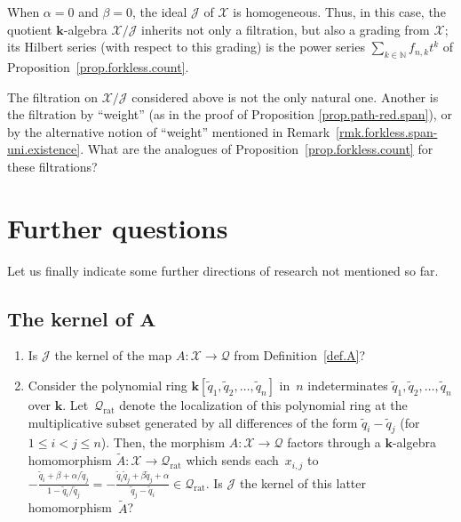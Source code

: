 \documentclass[pdftex]{sigma}
\numberwithin{equation}{section}
\let\sumnonlimits\sum
\renewcommand{\sum}{\sumnonlimits\limits}
\begin{document}
When $\alpha=0$ and $\beta=0$, the ideal $\mathcal{J}$ of $\mathcal{X}$ is homogeneous. Thus, in this case, the quotient $\mathbf{k}$-algebra $\mathcal{X}/\mathcal{J}$ inherits not only a filtration, but also a grading from $\mathcal{X}$; its Hilbert series (with respect to this grading) is the power series $\sum_{k\in\mathbb{N}}f_{n,k}t^{k}$ of Proposition~\ref{prop.forkless.count}.

\begin{question}The filtration on $\mathcal{X}/\mathcal{J}$ considered above is not the only natural one. Another is the filtration by ``weight'' (as in the proof of Proposition \ref{prop.path-red.span}), or by the alternative notion of ``weight'' mentioned in Remark~\ref{rmk.forkless.span-uni.existence}. What are the analogues of Proposition~\ref{prop.forkless.count} for these filtrations?
\end{question}

\section{Further questions}

Let us finally indicate some further directions of research not mentioned so far.

\subsection[The kernel of $A$]{The kernel of $\boldsymbol{A}$}\label{subsect.Qrat}
\begin{question}\label{quest.Ainj}\quad
\begin{enumerate}\itemsep=0pt
\item[(a)] Is $\mathcal{J}$ the kernel of the map $A\colon \mathcal{X}\rightarrow\mathcal{Q}$ from Definition~\ref{def.A}?

\item[(b)] Consider the polynomial ring $\mathbf{k}[ \widetilde{q}_{1},\widetilde{q}_{2},\ldots,\widetilde{q}_{n}] $ in~$n$ indeterminates $\widetilde{q}_{1},\widetilde{q}_{2},\ldots,\widetilde{q}_{n}$ over $\mathbf{k}$. Let~$\mathcal{Q}_{\operatorname*{rat}}$ denote the localization of this polynomial ring at the multiplicative subset gene\-ra\-ted by all differences of the form $\widetilde{q}_{i}-\widetilde{q}_{j}$ (for $1\leq i<j\leq n$). Then, the morphism $A\colon \mathcal{X}\rightarrow\mathcal{Q}$ factors through a $\mathbf{k}$-algebra homomorphism $\widetilde{A}\colon \mathcal{X} \rightarrow\mathcal{Q}_{\operatorname*{rat}}$ which sends each~$x_{i,j}$ to $-\frac{\widetilde{q}_{i}+\beta+\alpha/\widetilde{q}_{j}}{1-\widetilde{q} _{i}/\widetilde{q}_{j}}=-\frac{\widetilde{q}_{i}\widetilde{q}_{j}+\beta\widetilde{q}_{j}+\alpha}{\widetilde{q}_{j}-\widetilde{q}_{i}} \in\mathcal{Q}_{\operatorname*{rat}}$. Is $\mathcal{J}$ the kernel of this latter homomor\-phism~$\widetilde{A}$?
\end{enumerate}
\end{question}
\end{document}

